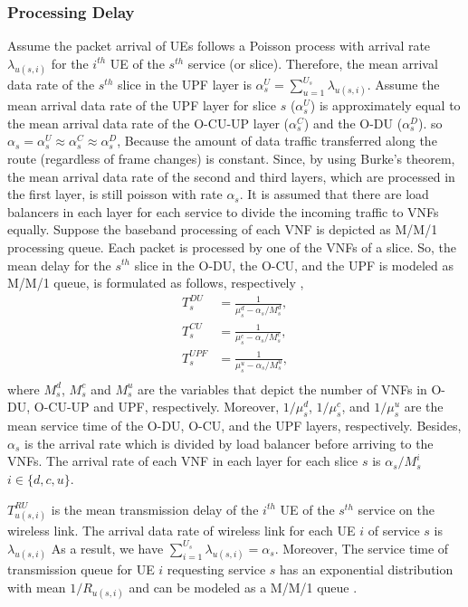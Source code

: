\documentclass{article}
\begin{document}
\subsubsection{Processing Delay}
Assume the packet arrival of UEs follows a Poisson process with arrival rate $\lambda_{u(s,i)}$ for the $i^{th}$ UE of the $s^{th}$ service (or slice).
Therefore, the mean arrival data rate of the $s^{th}$ slice in the UPF layer is $\alpha_{s}^U = \sum_{u=1}^{U_s}\lambda_{u(s,i)}$.
Assume the mean arrival data rate of the UPF layer for slice $s$ ($\alpha_{s}^U$) is approximately equal to the mean arrival data rate of the O-CU-UP layer ($\alpha_{s}^C$) and the O-DU ($\alpha_{s}^D$). so $\alpha_{s} =\alpha_{s}^U \approx \alpha_{s}^C \approx \alpha_{s}^D$,
Because the amount of data traffic transferred along the route (regardless of frame changes) is constant.
Since, by using Burke’s theorem, the mean arrival data rate of the second and third layers, which are processed in the first layer, is still poisson with rate $\alpha_{s}$.
It is assumed that there are load balancers in each layer for each service to divide the incoming traffic to VNFs equally. %
Suppose the baseband processing of each VNF is depicted as M/M/1 processing queue.
Each packet is processed by one of the VNFs of a slice. So, the mean delay for the $s^{th}$ slice in the O-DU, the O-CU, and the UPF is modeled as M/M/1 queue, is formulated as follows, respectively \cite{SystemCostMinimization,luong2018joint,luong2018novel},
\begin{equation}
\begin{split}
T_{s}^{DU} &= \frac{1}{\mu_s^d - \alpha_{s}/{M_s^{d}}},\\
T_{s}^{CU} &= \frac{1}{\mu_s^c - \alpha_{s}/{M_s^{c}}},\\
T_{s}^{UPF} &= \frac{1}{\mu_s^u - \alpha_{s}/{M_s^{u}}},\\
\end{split}
\end{equation}
where $M_s^{d}$, $M_s^{c}$ and 
$M_s^{u}$ are the variables that depict the number of VNFs in O-DU, O-CU-UP and UPF, respectively. 
Moreover, $1/\mu_s^d$, $1/\mu_s^c$, and $1/\mu_s^u$ are the mean service time of the O-DU, O-CU, and the UPF layers, respectively.
Besides, $\alpha_{s}$ is the  arrival rate which is divided
by load balancer before arriving to the VNFs. The arrival rate of each VNF in each layer for each slice 
$s$ is $\alpha_{s}/{M_s^{i}}$ $ i \in \{d,c, u\}$.

$T_{u(s,i)}^{RU}$ is the mean transmission delay of the $i^{th}$ UE of the $s^{th}$ service on the wireless link.
 The arrival data rate of wireless link for each UE $i$ of service $s$ is $\lambda_{u(s,i)}$
As a result, we have $\sum_{i = 1}^{U_s} \lambda_{u(s,i)} = \alpha_s$.
Moreover, The service time of transmission queue for UE $i$ requesting service $s$ has
an exponential distribution with mean $1/R_{u(s,i)}$ and can be modeled as a M/M/1 queue \cite{SystemCostMinimization,luong2018joint,luong2018novel}.
 
\end{document}
